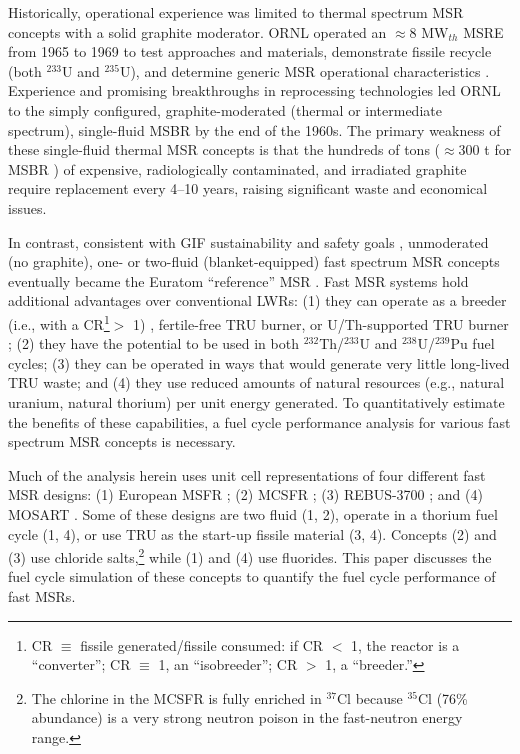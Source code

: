 \documentclass[letterpaper]{mandc2019}
\begin{document}
Historically, operational experience was limited to thermal spectrum \gls{MSR} concepts with a solid graphite moderator. 
\gls{ORNL} operated an $\approx$8 MW$_{th}$ \gls{MSRE} from 1965 to 1969 to test approaches and materials, demonstrate fissile recycle (both $^{233}$U and $^{235}$U), and determine generic \gls{MSR} operational characteristics \cite{macpherson_molten_1985}. 
Experience and promising breakthroughs in reprocessing technologies \cite{whatley_engineering_1970} led \gls{ORNL} to the simply configured, graphite-moderated (thermal or intermediate spectrum), single-fluid \gls{MSBR} by the end of the 1960s. 
The primary weakness of these single-fluid thermal \gls{MSR} concepts is that the hundreds of tons ($\approx$300 t for \gls{MSBR} \cite{robertson_conceptual_1971}) of expensive, radiologically contaminated, and irradiated graphite require replacement every 4--10 years, raising significant waste and economical issues.

In contrast, consistent with \gls{GIF} sustainability and safety goals \cite{gif_generation_2015}, unmoderated (no graphite), one- or two-fluid (blanket-equipped) fast spectrum \gls{MSR} concepts eventually became the Euratom ``reference'' \gls{MSR} \cite{euratom_final_2015}. Fast \gls{MSR} systems hold additional advantages over conventional \glspl{LWR}:
(1) they can operate as a breeder (i.e., with a \gls{CR}\footnote{\gls{CR} $\equiv$ fissile generated/fissile consumed: if CR $<$ 1, the reactor is a ``converter''; CR $\equiv$ 1, an ``isobreeder''; CR $>$ 1, a ``breeder.''}$>$ 1) \cite{euratom_final_2015, simmons_assessment_1974, mourogov_potentialities_2006-1}, fertile-free \gls{TRU} burner, or U/Th-supported \gls{TRU} burner \cite{ignatiev_progress_2007};
(2) they have the potential to be used in both $^{232}$Th/$^{233}$U and $^{238}$U/$^{239}$Pu fuel cycles;
(3) they can be operated in ways that would generate very little long-lived \gls{TRU} waste; and
(4) they use reduced amounts of natural resources (e.g., natural uranium, natural thorium) per unit energy generated. 
To quantitatively estimate the benefits of these capabilities, a fuel cycle performance analysis for various fast spectrum \gls{MSR} concepts is necessary.

Much of the analysis herein uses unit cell representations of four different fast \gls{MSR} designs:
(1) European \gls{MSFR} \cite{euratom_final_2015};
(2) \gls{MCSFR} \cite{simmons_assessment_1974};
(3) REBUS-3700 \cite{mourogov_potentialities_2006-1}; and
(4) \gls{MOSART} \cite{ignatiev_progress_2007}.
Some of these designs are two fluid (1, 2), operate in a thorium fuel cycle (1, 4), or use \gls{TRU} as the start-up fissile material (3, 4). 
Concepts (2) and (3) use chloride salts,\footnote{The chlorine in the \gls{MCSFR} is fully enriched in $^{37}$Cl because $^{35}$Cl (76\% abundance) is a very strong neutron poison in the fast-neutron energy range.} while (1) and (4) use fluorides. 
This paper discusses the fuel cycle simulation of these concepts to quantify the fuel cycle performance of fast \glspl{MSR}.
\end{document}
